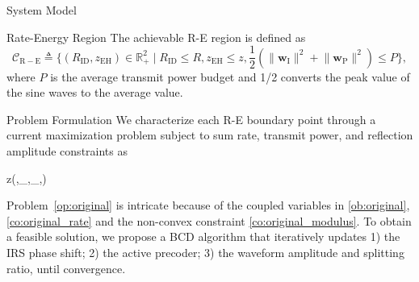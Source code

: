 \documentclass[journal,12pt,onecolumn,draftclsnofoot]{IEEEtran}
\begin{document}
\begin{section}{System Model}
		\begin{subsection}{Rate-Energy Region}
			The achievable R-E region is defined as
			\begin{equation}
				\mathcal{C}_{\mathrm{R-E}} \triangleq \biggl\{(R_{\mathrm{ID}}, z_{\mathrm{EH}}) \in \mathbb{R}_+^2 \mid R_{\mathrm{ID}} \le R, z_{\mathrm{EH}} \le z, \frac{1}{2}\left(\lVert{\boldsymbol{w}_{\mathrm{I}}}\rVert^2+\lVert{\boldsymbol{w}_{\mathrm{P}}}\rVert^2\right) \le P\biggr\},
			\end{equation}
			where $P$ is the average transmit power budget and \num{1/2} converts the peak value of the sine waves to the average value.
		\end{subsection}
	\end{section}


	\begin{section}{Problem Formulation}\label{se:problem_formulation}
		We characterize each R-E boundary point through a current maximization problem subject to sum rate, transmit power, and reflection amplitude constraints as
		\begin{maxi!}
			{}{z(\boldsymbol{\phi},_{},_{},\rho)}{\label{op:original}}{\label{ob:original}}
			\label{co:original_rate}
			\label{co:original_power}
			\label{co:original_modulus}
		\end{maxi!}
		Problem~\eqref{op:original} is intricate because of the coupled variables in \eqref{ob:original}, \eqref{co:original_rate} and the non-convex constraint \eqref{co:original_modulus}. To obtain a feasible solution, we propose a BCD algorithm that iteratively updates 1) the IRS phase shift; 2) the active precoder; 3) the waveform amplitude and splitting ratio, until convergence.



\end{section}
\end{document}
